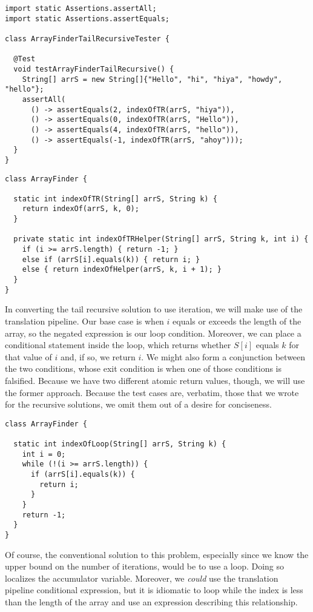 \begin{lstlisting}[language=MyJava]
import static Assertions.assertAll;
import static Assertions.assertEquals;

class ArrayFinderTailRecursiveTester {

  @Test
  void testArrayFinderTailRecursive() {
    String[] arrS = new String[]{"Hello", "hi", "hiya", "howdy", "hello"};
    assertAll(
      () -> assertEquals(2, indexOfTR(arrS, "hiya")),
      () -> assertEquals(0, indexOfTR(arrS, "Hello")),
      () -> assertEquals(4, indexOfTR(arrS, "hello")),
      () -> assertEquals(-1, indexOfTR(arrS, "ahoy")));
  }
}
\end{lstlisting}

\begin{lstlisting}[language=MyJava]
class ArrayFinder {

  static int indexOfTR(String[] arrS, String k) {
    return indexOf(arrS, k, 0);
  }

  private static int indexOfTRHelper(String[] arrS, String k, int i) {
    if (i >= arrS.length) { return -1; } 
    else if (arrS[i].equals(k)) { return i; } 
    else { return indexOfHelper(arrS, k, i + 1); }
  } 
}
\end{lstlisting}

In converting the tail recursive solution to use iteration, we will make use of the translation pipeline. Our base case is when $i$ equals or exceeds the length of the array, so the negated expression is our loop condition. Moreover, we can place a conditional statement inside the loop, which returns whether $S[i]$ equals $k$ for that value of $i$ and, if so, we return $i$. We might also form a conjunction between the two conditions, whose exit condition is when one of those conditions is falsified. Because we have two different atomic return values, though, we will use the former approach. Because the test cases are, verbatim, those that we wrote for the recursive solutions, we omit them out of a desire for conciseness.

\begin{lstlisting}[language=MyJava]
class ArrayFinder {

  static int indexOfLoop(String[] arrS, String k) {
    int i = 0;
    while (!(i >= arrS.length)) {
      if (arrS[i].equals(k)) { 
        return i; 
      }
    }
    return -1;
  }
}
\end{lstlisting}

Of course, the conventional solution to this problem, especially since we know the upper bound on the number of iterations, would be to use a  loop. Doing so localizes the accumulator variable. Moreover, we \emph{could} use the translation pipeline conditional expression, but it is idiomatic to loop while the index is less than the length of the array and use an expression describing this relationship.

